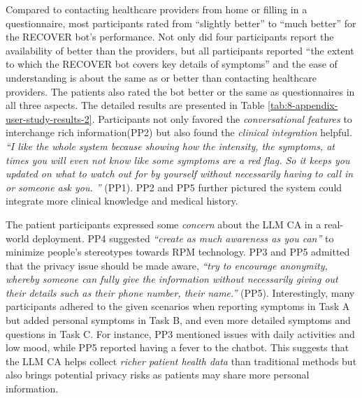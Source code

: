 Compared to contacting healthcare providers from home or filling in a questionnaire, most participants rated from ``slightly better'' to ``much better'' for the RECOVER bot's performance. Not only did four participants report the availability of \projectname{} better than the providers, but all participants reported ``the extent to which the RECOVER bot covers key details of symptoms'' and the ease of understanding is about the same as or better than contacting healthcare providers. The patients also rated the \projectname{} bot better or the same as questionnaires in all three aspects.
The detailed results are presented in Table \ref{tab:8-appendix-user-study-results-2}. Participants not only favored the \textit{conversational features} to interchange rich information(PP2) but also found the \textit{clinical integration} helpful. 
\textit{``I like the whole system because showing how the intensity, the symptoms, at times you will even not know like some symptoms are a red flag. So it keeps you updated on what to watch out for by yourself without necessarily having to call in or someone ask you. '' }(PP1). PP2 and PP5 further pictured the system could integrate more clinical knowledge and medical history.

The patient participants expressed some \textit{concern} about the LLM CA in a real-world deployment.
PP4 suggested \textit{``create as much awareness as you can''} to minimize people's stereotypes towards RPM technology.
PP3 and PP5 admitted that the privacy issue should be made aware, 
\textit{``try to encourage anonymity, whereby someone can fully give the information without necessarily giving out their details such as their phone number, their name.''} (PP5).
Interestingly, many participants adhered to the given scenarios when reporting symptoms in Task A but added personal symptoms in Task B, and even more detailed symptoms and questions in Task C. For instance, PP3 mentioned issues with daily activities and low mood, while PP5 reported having a fever to the chatbot. This suggests that the LLM CA helps collect \textit{richer patient health data} than traditional methods but also brings potential privacy risks as patients may share more personal information.
